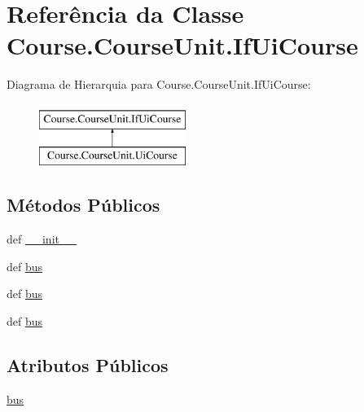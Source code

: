 \hypertarget{classCourse_1_1CourseUnit_1_1IfUiCourse}{\section{Referência da Classe Course.\-Course\-Unit.\-If\-Ui\-Course}
\label{d6/d82/classCourse_1_1CourseUnit_1_1IfUiCourse}
}
Diagrama de Hierarquia para Course.\-Course\-Unit.\-If\-Ui\-Course\-:\begin{figure}[H]
\begin{center}
\leavevmode
\includegraphics[height=2.000000cm]{d6/d82/classCourse_1_1CourseUnit_1_1IfUiCourse}
\end{center}
\end{figure}
\subsection*{Métodos Públicos}
\begin{DoxyCompactItemize}
\item 
def \hyperlink{classCourse_1_1CourseUnit_1_1IfUiCourse_a2520bf9924cf4f583820ad9fac468fe2}{\-\_\-\-\_\-init\-\_\-\-\_\-}
\item 
def \hyperlink{classCourse_1_1CourseUnit_1_1IfUiCourse_a6d3c42a9777fe9dd395d9390aef47903}{bus}
\item 
def \hyperlink{classCourse_1_1CourseUnit_1_1IfUiCourse_a6d3c42a9777fe9dd395d9390aef47903}{bus}
\item 
def \hyperlink{classCourse_1_1CourseUnit_1_1IfUiCourse_a6d3c42a9777fe9dd395d9390aef47903}{bus}
\end{DoxyCompactItemize}
\subsection*{Atributos Públicos}
\begin{DoxyCompactItemize}
\item 
\hyperlink{classCourse_1_1CourseUnit_1_1IfUiCourse_a228fc709b99da3a7e6f5020bd07cee03}{bus}
\end{DoxyCompactItemize}


